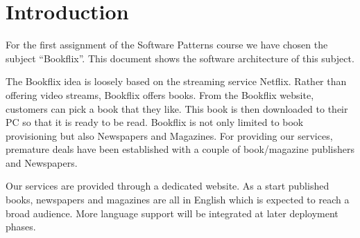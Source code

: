 \chapter*{Introduction}
For the first assignment of the Software Patterns course we have chosen the subject ``Bookflix''. This document shows the software architecture of this subject. 


The Bookflix idea is loosely based on the streaming service Netflix. Rather than offering video streams, Bookflix offers books. From the Bookflix website, customers can pick a book that they like. This book is then downloaded to their PC so that it is ready to be read. Bookflix is not only limited to book provisioning but also Newspapers and Magazines. For providing our services, premature deals have been established with a couple of book/magazine publishers and Newspapers.

Our services are provided through a dedicated website. As a start published books, newspapers and magazines are all in English which is expected to reach a broad audience. More language support will be integrated at later deployment phases.




